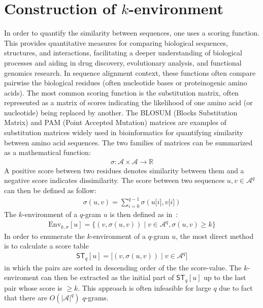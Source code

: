 \documentclass[twoside,a4paper,bsc]{master}
\newcommand{\Qgram}[1]{\(#1\)-gram}
\newcommand{\Subchar}[2]{#1\lbrack #2\rbrack}
\newcommand{\Scoretablename}[0]{\mathsf{ST}}
\newcommand{\Scoretable}[2]{\Scoretablename_{#1}[#2]}
\newcommand{\Reals}{\mathbb{R}}
\newcommand{\Alpha}[0]{\mathcal{A}}
\begin{document}
\section{Construction of \(k\)-environment \label{section:qgramgen}}
In order to quantify the similarity between sequences, one uses a scoring
function. This provides quantitative measures for comparing biological
sequences, structures, and interactions, facilitating a deeper
understanding of biological processes and aiding in drug discovery,
evolutionary analysis, and functional genomics research.
In sequence
alignment context, these functions often compare pairwise the biological
residues (often nucleotide bases or proteinogenic amino acids). The most
common scoring function is the substitution matrix, often represented as a
matrix of scores indicating the likelihood of one amino acid (or
nucleotide) being replaced by another. The BLOSUM (Blocks Substitution
Matrix) and PAM (Point Accepted Mutation) matrices are examples of
substitution matrices widely used in bioinformatics for quantifying
similarity
between amino acid sequences.
The two families of
matrices can be summarized as a mathematical function:
\begin{align}
\sigma: \mathcal{A} \times \mathcal{A} \rightarrow \Reals
\end{align}
A positive score between two residues denotes similarity between them
and a negative score indicates dissimilarity. The score between two
sequences \(u,v\in \Alpha^q\) can then be defined as follow:
\begin{align}
\sigma(u,v)=\sum_{i=0}^{q-1}\sigma(\Subchar{u}{i},\Subchar{v}{i})\label{equation:sequenceScore}
\end{align}
The \(k\)-environment of a \Qgram{q} \(u\) is then defined as
in~\cite{gsa}:
\begin{align}
\text{Env}_{k,\sigma}[u] = \{(v,\sigma(u,v))\mid v\in
\Alpha^q,\sigma(u,v)\geq
k\}
\end{align}
In order to enumerate the \(k\)-environment of a \Qgram{q} \(u\), the most 
direct method is to calculate a score table
\begin{align}
\Scoretable{q}{u}=\lbrack (v,\sigma(u,v))\mid v\in\Alpha^{q}\rbrack
\label{eq:scoreTableDef}
\end{align}
in which the pairs are sorted in descending order of the the score-value.
The \(k\)-enviroment
can then be extracted as the initial part of \(\Scoretable{q}{u}\) up to
the
last pair whose score is \(\geq k\).
This approach is often infeasible for large \(q\) due to fact that there
are \(O(|\Alpha|^{q})\) \(q\)-grams. 
\end{document}
